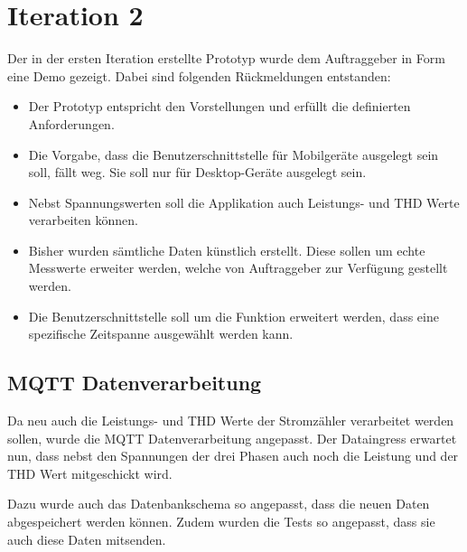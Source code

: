 \section{Iteration 2}

Der in der ersten Iteration erstellte Prototyp wurde dem Auftraggeber in Form eine Demo gezeigt.
Dabei sind folgenden Rückmeldungen entstanden:

\begin{itemize}
    \item Der Prototyp entspricht den Vorstellungen und erfüllt die definierten Anforderungen.
    \item Die Vorgabe, dass die Benutzerschnittstelle für Mobilgeräte ausgelegt sein soll, fällt weg.
          Sie soll nur für Desktop-Geräte ausgelegt sein.
    \item Nebst Spannungswerten soll die Applikation auch Leistungs- und \ac{THD} Werte verarbeiten können.
    \item Bisher wurden sämtliche Daten künstlich erstellt.
    Diese sollen um echte Messwerte erweiter werden, welche von Auftraggeber zur Verfügung gestellt werden.
    \item Die Benutzerschnittstelle soll um die Funktion erweitert werden,
    dass eine spezifische Zeitspanne ausgewählt werden kann.



\end{itemize}

\subsection{\ac{MQTT} Datenverarbeitung}

Da neu auch die Leistungs- und \ac{THD} Werte der Stromzähler verarbeitet werden sollen, wurde
die \ac{MQTT} Datenverarbeitung angepasst. Der Dataingress erwartet nun, dass nebst
den Spannungen der drei Phasen auch noch die Leistung und der \ac{THD} Wert mitgeschickt wird.

Dazu wurde auch das Datenbankschema so angepasst, dass die neuen Daten abgespeichert
werden können. Zudem wurden die Tests so angepasst, dass sie auch diese Daten
mitsenden.

